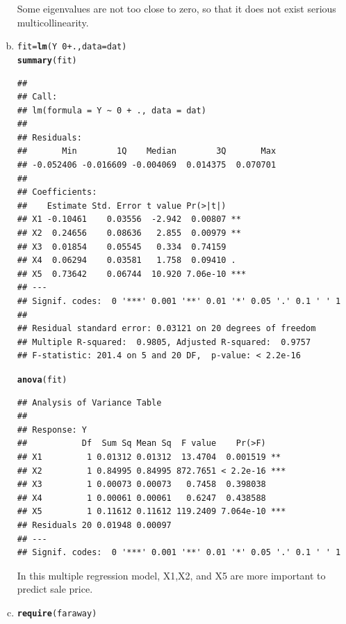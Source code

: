 \documentclass{article}\usepackage[]{graphicx}\usepackage[]{color}
\makeatletter
\newcommand{\hlnum}[1]{\textcolor[rgb]{0.686,0.059,0.569}{#1}}%
\newcommand{\hlopt}[1]{\textcolor[rgb]{0,0,0}{#1}}%
\newcommand{\hlstd}[1]{\textcolor[rgb]{0.345,0.345,0.345}{#1}}%
\newcommand{\hlkwb}[1]{\textcolor[rgb]{0.69,0.353,0.396}{#1}}%
\newcommand{\hlkwc}[1]{\textcolor[rgb]{0.333,0.667,0.333}{#1}}%
\newcommand{\hlkwd}[1]{\textcolor[rgb]{0.737,0.353,0.396}{\textbf{#1}}}%
\newenvironment{kframe}{%
 \def\at@end@of@kframe{}%
 \ifinner\ifhmode%
  \def\at@end@of@kframe{\end{minipage}}%
  \begin{minipage}{\columnwidth}%
 \fi\fi%
 \def\FrameCommand##1{\hskip\@totalleftmargin \hskip-\fboxsep
 \colorbox{shadecolor}{##1}\hskip-\fboxsep
     \hskip-\linewidth \hskip-\@totalleftmargin \hskip\columnwidth}%
 \MakeFramed {\advance\hsize-\width
   \@totalleftmargin\z@ \linewidth\hsize
   \@setminipage}}%
 {\par\unskip\endMakeFramed%
 \at@end@of@kframe}
\newenvironment{knitrout}{}{} %
\makeatother
\begin{document}
\begin{enumerate}[(a)]
\qquad Some eigenvalues are not too close to zero, so that it does not exist serious multicollinearity.

\item

\begin{knitrout}
\color{fgcolor}\begin{kframe}
\begin{alltt}
  \hlstd{fit} \hlkwb{=} \hlkwd{lm}\hlstd{(Y} \hlopt{~} \hlnum{0} \hlopt{+} \hlstd{.,} \hlkwc{data} \hlstd{= dat)}
  \hlkwd{summary}\hlstd{(fit)}
\end{alltt}
\begin{verbatim}
## 
## Call:
## lm(formula = Y ~ 0 + ., data = dat)
## 
## Residuals:
##       Min        1Q    Median        3Q       Max 
## -0.052406 -0.016609 -0.004069  0.014375  0.070701 
## 
## Coefficients:
##    Estimate Std. Error t value Pr(>|t|)    
## X1 -0.10461    0.03556  -2.942  0.00807 ** 
## X2  0.24656    0.08636   2.855  0.00979 ** 
## X3  0.01854    0.05545   0.334  0.74159    
## X4  0.06294    0.03581   1.758  0.09410 .  
## X5  0.73642    0.06744  10.920 7.06e-10 ***
## ---
## Signif. codes:  0 '***' 0.001 '**' 0.01 '*' 0.05 '.' 0.1 ' ' 1
## 
## Residual standard error: 0.03121 on 20 degrees of freedom
## Multiple R-squared:  0.9805,	Adjusted R-squared:  0.9757 
## F-statistic: 201.4 on 5 and 20 DF,  p-value: < 2.2e-16
\end{verbatim}
\begin{alltt}
  \hlkwd{anova}\hlstd{(fit)}
\end{alltt}
\begin{verbatim}
## Analysis of Variance Table
## 
## Response: Y
##           Df  Sum Sq Mean Sq  F value    Pr(>F)    
## X1         1 0.01312 0.01312  13.4704  0.001519 ** 
## X2         1 0.84995 0.84995 872.7651 < 2.2e-16 ***
## X3         1 0.00073 0.00073   0.7458  0.398038    
## X4         1 0.00061 0.00061   0.6247  0.438588    
## X5         1 0.11612 0.11612 119.2409 7.064e-10 ***
## Residuals 20 0.01948 0.00097                       
## ---
## Signif. codes:  0 '***' 0.001 '**' 0.01 '*' 0.05 '.' 0.1 ' ' 1
\end{verbatim}
\end{kframe}
\end{knitrout}

\qquad In this multiple regression model, X1,X2, and X5 are more important to predict sale price.

\item
\begin{knitrout}
\color{fgcolor}\begin{kframe}
\begin{alltt}
  \hlkwd{require}\hlstd{(faraway)}
\end{alltt}



\end{kframe}
\end{knitrout}
\end{enumerate}
\end{document}
